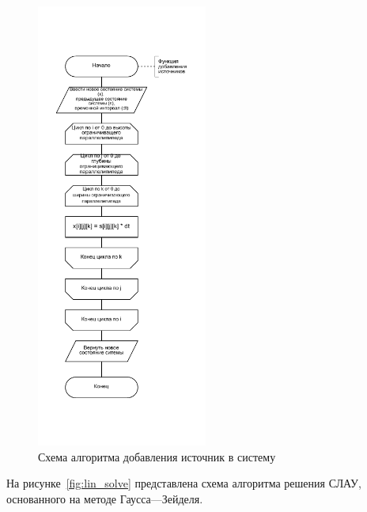 \begin{figure}[H]
	\centering
	\includegraphics[width=0.5\textwidth, page=1]{assets/img/add_source.pdf}
	\caption{Схема алгоритма добавления источник в систему}
	\label{fig:add_src}
\end{figure}

На рисунке~\ref{fig:lin_solve} представлена схема алгоритма решения СЛАУ, основанного на методе Гаусса---Зейделя.

